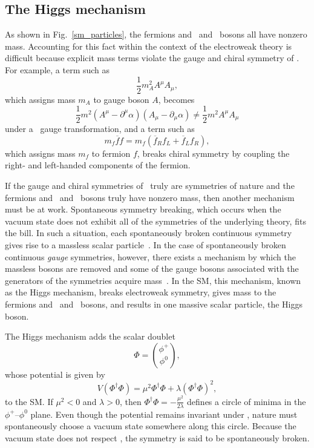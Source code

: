 \subsection{The Higgs mechanism}
As shown in Fig.~\ref{sm_particles}, the fermions and \PWpm\ and \cPZ\ bosons all have nonzero mass. Accounting for this fact within the context of the electroweak theory is difficult because explicit mass terms violate the gauge and chiral symmetry of \ewsymm. For example, a term such as
\begin{equation}
    \frac{1}{2}m_{A}^{2}A^{\mu}A_{\mu},
\end{equation}
which assigns mass $m_{A}$ to gauge boson $A$, becomes
\begin{equation}
    \frac{1}{2}m^{2}(A^{\mu}-\partial^{\mu}\alpha)(A_{\mu}-\partial_{\mu}\alpha) \neq \frac{1}{2}m^{2}A^{\mu}A_{\mu}
\end{equation}
under a \uoney\ gauge transformation, and a term such as
\begin{equation}
    m_{f}\overline{f}f = m_{f}(\overline{f}_{R}f_{L} + \overline{f}_{L}f_{R}),
\end{equation}
which assigns mass $m_{f}$ to fermion $f$, breaks chiral symmetry by coupling the right- and left-handed components of the fermion.

If the gauge and chiral symmetries of \smsymm\ truly are symmetries of nature and the fermions and \PWpm\ and \cPZ\ bosons truly have nonzero mass, then another mechanism must be at work. Spontaneous symmetry breaking, which occurs when the vacuum state does not exhibit all of the symmetries of the underlying theory, fits the bill. In such a situation, each spontaneously broken continuous symmetry gives rise to a massless scalar particle~\cite{goldstone_salam_weinberg}. In the case of spontaneously broken continuous \textit{gauge} symmetries, however, there exists a mechanism by which the massless bosons are removed and some of the gauge bosons associated with the generators of the symmetries acquire mass~\cite{englert, higgs, kibble}. In the SM, this mechanism, known as the Higgs mechanism, breaks electroweak symmetry, gives mass to the fermions and \PWpm\ and \cPZ\ bosons, and results in one massive scalar particle, the Higgs boson.

The Higgs mechanism adds the scalar doublet
\begin{equation}
    \Phi = \binom{\phi^{+}}{\phi^{0}},
\end{equation}
whose potential is given by
\begin{equation}
    V(\Phi^{\dagger}\Phi) = \mu^{2}\Phi^{\dagger}\Phi + \lambda(\Phi^{\dagger}\Phi)^{2},
\end{equation}
to the SM. If $\mu^{2}<0$ and $\lambda>0$, then $\Phi^{\dagger}\Phi = -\frac{\mu^{2}}{2\lambda}$ defines a circle of minima in the $\phi^{+}$--$\phi^{0}$ plane. Even though the potential remains invariant under \ewsymm, nature must spontaneously choose a vacuum state somewhere along this circle. Because the vacuum state does not respect \ewsymm, the symmetry is said to be spontaneously broken.

